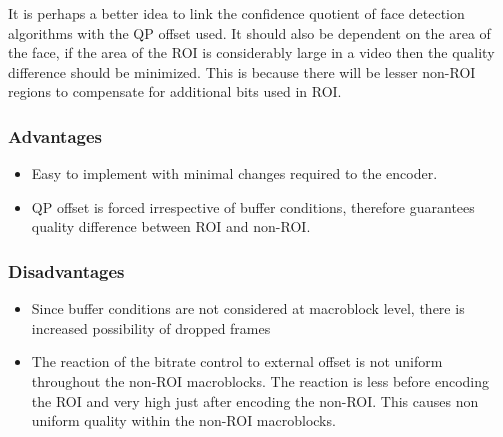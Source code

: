 \documentclass[11pt]{article} %
\begin{document}
It is perhaps a better idea to link the confidence quotient of face detection algorithms with the QP offset used. It should also be dependent on the area of the face, if the area of the ROI is considerably large in a video then the quality difference should be minimized. This is because there will be lesser non-ROI regions to compensate for additional bits used in ROI.
\subsubsection*{Advantages}
\begin{itemize}
\item Easy to implement with minimal changes required to the encoder.
\item QP offset is forced irrespective of buffer conditions, therefore guarantees quality difference between ROI and non-ROI.
\end{itemize}

\subsubsection*{Disadvantages}
\begin{itemize}
\item Since buffer conditions are not considered at macroblock level, there is increased possibility of dropped frames
\item The reaction of the bitrate control to external offset is not uniform throughout the non-ROI macroblocks. The reaction is less before encoding the ROI and very high just after encoding the non-ROI. This causes non uniform quality within the non-ROI macroblocks. 
\end{itemize}
%
\end{document}
